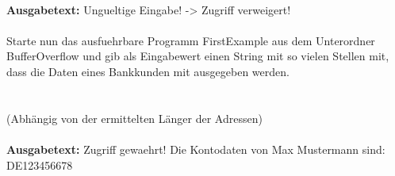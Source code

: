 \\
\textbf{Ausgabetext:} Ungueltige Eingabe! -> Zugriff verweigert!
\\\\
Starte nun das ausfuehrbare Programm FirstExample aus dem Unterordner BufferOverflow und gib als Eingabewert einen String mit so vielen Stellen mit, dass die Daten eines Bankkunden mit ausgegeben werden.\\\\
\\
(Abhängig von der ermittelten Länger der Adressen)\\\\
\textbf{Ausgabetext:} Zugriff gewaehrt! Die Kontodaten von Max Mustermann sind: DE123456678
\\
